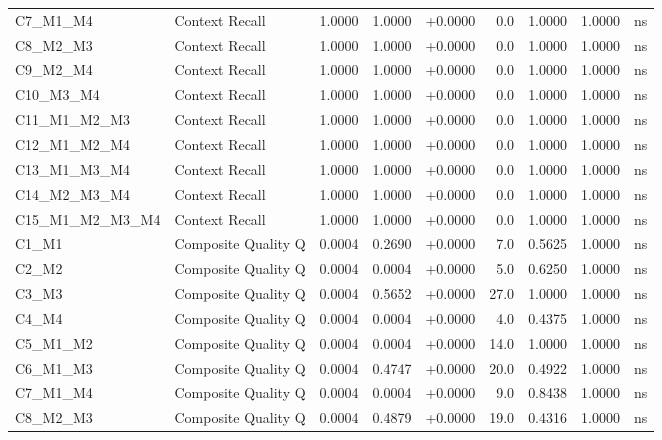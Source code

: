 \begin{table}[p]
\begin{tabular*}{\textwidth}{@{\extracolsep{\fill}} l l r r r r r r c @{}}
\addlinespace
C7\_M1\_M4      & Context Recall       & 1.0000 & 1.0000 & +0.0000 & 0.0 & 1.0000 & 1.0000 & ns \\
\addlinespace
C8\_M2\_M3      & Context Recall       & 1.0000 & 1.0000 & +0.0000 & 0.0 & 1.0000 & 1.0000 & ns \\
\addlinespace
C9\_M2\_M4      & Context Recall       & 1.0000 & 1.0000 & +0.0000 & 0.0 & 1.0000 & 1.0000 & ns \\
\addlinespace
C10\_M3\_M4     & Context Recall       & 1.0000 & 1.0000 & +0.0000 & 0.0 & 1.0000 & 1.0000 & ns \\
\addlinespace
C11\_M1\_M2\_M3 & Context Recall       & 1.0000 & 1.0000 & +0.0000 & 0.0 & 1.0000 & 1.0000 & ns \\
\addlinespace
C12\_M1\_M2\_M4 & Context Recall       & 1.0000 & 1.0000 & +0.0000 & 0.0 & 1.0000 & 1.0000 & ns \\
\addlinespace
C13\_M1\_M3\_M4 & Context Recall       & 1.0000 & 1.0000 & +0.0000 & 0.0 & 1.0000 & 1.0000 & ns \\
\addlinespace
C14\_M2\_M3\_M4 & Context Recall       & 1.0000 & 1.0000 & +0.0000 & 0.0 & 1.0000 & 1.0000 & ns \\
\addlinespace
C15\_M1\_M2\_M3\_M4 & Context Recall       & 1.0000 & 1.0000 & +0.0000 & 0.0 & 1.0000 & 1.0000 & ns \\
\addlinespace
C1\_M1          & Composite Quality Q  & 0.0004 & 0.2690 & +0.0000 & 7.0 & 0.5625 & 1.0000 & ns \\
\addlinespace
C2\_M2          & Composite Quality Q  & 0.0004 & 0.0004 & +0.0000 & 5.0 & 0.6250 & 1.0000 & ns \\
\addlinespace
C3\_M3          & Composite Quality Q  & 0.0004 & 0.5652 & +0.0000 & 27.0 & 1.0000 & 1.0000 & ns \\
\addlinespace
C4\_M4          & Composite Quality Q  & 0.0004 & 0.0004 & +0.0000 & 4.0 & 0.4375 & 1.0000 & ns \\
\addlinespace
C5\_M1\_M2      & Composite Quality Q  & 0.0004 & 0.0004 & +0.0000 & 14.0 & 1.0000 & 1.0000 & ns \\
\addlinespace
C6\_M1\_M3      & Composite Quality Q  & 0.0004 & 0.4747 & +0.0000 & 20.0 & 0.4922 & 1.0000 & ns \\
\addlinespace
C7\_M1\_M4      & Composite Quality Q  & 0.0004 & 0.0004 & +0.0000 & 9.0 & 0.8438 & 1.0000 & ns \\
\addlinespace
C8\_M2\_M3      & Composite Quality Q  & 0.0004 & 0.4879 & +0.0000 & 19.0 & 0.4316 & 1.0000 & ns \\

\end{tabular*}
\end{table}
